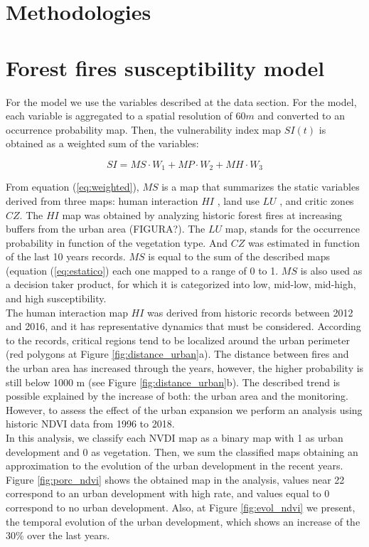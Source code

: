 
\section{Methodologies}

\section*{Forest fires susceptibility model}

For the model we use the variables described at the data section. For the model, each variable is aggregated to a spatial resolution of $60m$ and converted to an occurrence probability map. Then, the vulnerability index map $SI(t)$ is obtained as a weighted sum of the variables: 

 \begin{equation}
     SI = MS \cdot W_{1} + MP \cdot W_{2} +MH \cdot W_{3}
     \label{eq:weighted}
 \end{equation}

From equation (\ref{eq:weighted}), $MS$ is a map that summarizes the static variables derived from three maps: human interaction $HI$ , land use $LU$ , and critic zones $CZ$. The $HI$ map was obtained by analyzing historic forest fires at increasing buffers from the urban area (FIGURA?). The $LU$ map, stands for the occurrence probability in function of the vegetation type. And $CZ$ was estimated in function of the last 10 years records. $MS$ is equal to the sum of the described maps (equation (\ref{eq:estatico}) each one mapped to a range of 0 to 1. $MS$ is also used as a decision taker product, for which it is categorized into low, mid-low, mid-high, and high susceptibility.\\

The human interaction map $HI$ was derived from historic records between 2012 and 2016, and it has representative dynamics that must be considered.  According to the records, critical regions tend to be localized around the urban perimeter (red polygons at Figure \ref{fig:distance_urban}a). The distance between fires and the urban area has increased through the years, however, the higher probability is still below 1000 m (see  Figure \ref{fig:distance_urban}b).  The described trend is possible explained by the increase of both: the urban area and the monitoring. However, to assess the effect of the urban expansion we perform an analysis using historic NDVI data from 1996 to 2018.\\    

In this analysis, we classify each NVDI map as a binary map with 1 as urban development and 0 as vegetation.  Then, we sum the classified maps obtaining an approximation to the evolution of the urban development in the recent years. Figure \ref{fig:porc_ndvi} shows the obtained map in the analysis, values near 22 correspond to an urban development with high rate, and values equal to 0 correspond to no urban development. Also, at Figure \ref{fig:evol_ndvi} we present, the temporal evolution of the urban development, which shows an increase of the 30\% over the last years.     




